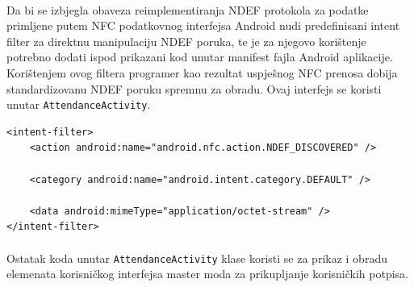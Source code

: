 \paragraph*{}
Da bi se izbjegla obaveza reimplementiranja NDEF protokola za podatke primljene putem NFC podatkovnog interfejsa Android nudi predefinisani intent filter za direktnu manipulaciju NDEF poruka, te je za njegovo korištenje potrebno dodati ispod prikazani kod unutar manifest fajla Android aplikacije. Korištenjem ovog filtera programer kao rezultat uspješnog NFC prenosa dobija standardizovanu NDEF poruku spremnu za obradu. Ovaj interfejs se koristi unutar \texttt{AttendanceActivity}.

\begin{verbatim}
<intent-filter>
    <action android:name="android.nfc.action.NDEF_DISCOVERED" />

    <category android:name="android.intent.category.DEFAULT" />

    <data android:mimeType="application/octet-stream" />
</intent-filter>
\end{verbatim}

\paragraph*{}
Ostatak koda unutar \texttt{AttendanceActivity} klase koristi se za prikaz i obradu elemenata korisničkog interfejsa master moda za prikupljanje korisničkih potpisa.